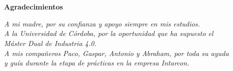 \chapter*{}

\begin{flushright}
    \Huge{\textbf{Agradecimientos}}
\end{flushright}
\vspace{10mm}
\begin{flushright}
    \textit{A mi madre, por su confianza y apoyo siempre en mis estudios. \\
    A la Universidad de Córdoba, por la oportunidad que ha supuesto el \\ Máster Dual de Industria 4.0. \\
    A mis compañeros Paco, Gaspar, Antonio y Abraham, por toda su ayuda \\ y guía durante la etapa de prácticas en la empresa Intarcon.}
\end{flushright}

\clearpage